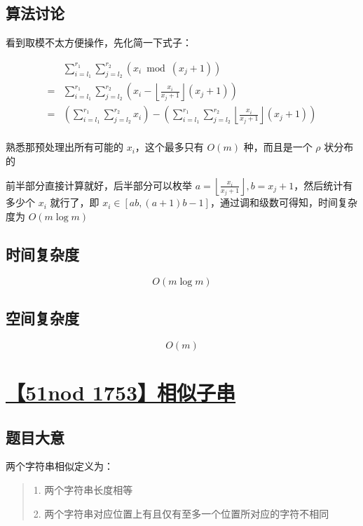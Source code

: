 \documentclass[UTF8]{article}
\begin{document}
\subsection{算法讨论}

看到取模不太方便操作，先化简一下式子：

$$
\begin{aligned}
&\sum_{i=l_1}^{r_1}\sum_{j=l_2}^{r_2} \left(x_i \bmod (x_j+1)\right) \\
=&\sum_{i=l_1}^{r_1}\sum_{j=l_2}^{r_2} \left(x_i-\left\lfloor \frac{x_i}{x_j+1} \right\rfloor (x_j+1)\right) \\
=&\left(\sum_{i=l_1}^{r_1}\sum_{j=l_2}^{r_2} x_i\right)-\left(\sum_{i=l_1}^{r_1}\sum_{j=l_2}^{r_2}\left\lfloor \frac{x_i}{x_j+1} \right\rfloor (x_j+1)\right) \\
\end{aligned}
$$

熟悉那预处理出所有可能的 $x_i$，这个最多只有 $O(m)$ 种，而且是一个 $\rho$ 状分布的

前半部分直接计算就好，后半部分可以枚举 $a=\left\lfloor \frac{x_i}{x_j+1} \right\rfloor,b=x_j+1$，然后统计有多少个 $x_i$ 就行了，即 $x_i \in [ab,(a+1)b-1]$，通过调和级数可得知，时间复杂度为 $O(m \log m)$

\subsection{时间复杂度}

$$
O(m \log m)
$$

\subsection{空间复杂度}

$$
O(m)
$$

\section{\href{http://www.51nod.com/Challenge/Problem.html?problemId=1753}{【51nod 1753】相似子串}}

\subsection{题目大意}

两个字符串相似定义为：

\begin{quotation}
1. 两个字符串长度相等

2. 两个字符串对应位置上有且仅有至多一个位置所对应的字符不相同
\end{quotation}
\end{document}
